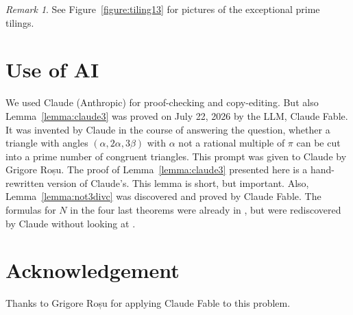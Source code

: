 \documentclass{amsart}
\theoremstyle{plain}
\theoremstyle{definition}
\theoremstyle{remark}
\newtheorem*{remark}{Remark}
\begin{document}
\begin{remark} 
See Figure~\ref{figure:tiling13} for pictures of the exceptional prime tilings.
\end{remark}

\enlargethispage{3\baselineskip}





\section*{Use of AI}
We used Claude (Anthropic) for proof-checking and copy-editing. 
But also Lemma~\ref{lemma:claude3} was proved on
July 22, 2026 by the LLM, Claude Fable.  It was invented by Claude
in the course of answering the question, whether a triangle 
with angles $(\alpha,2\alpha,3\beta)$ with $\alpha$ not a rational
multiple of $\pi$ can be cut into a prime number of congruent triangles.
This prompt was given to Claude 
by Grigore Roșu.    The proof of Lemma~\ref{lemma:claude3}  presented here
is a hand-rewritten version of Claude's.  
This lemma is short, but important.
Also, Lemma~\ref{lemma:not3divc} was discovered and proved by Claude Fable.
The formulas for $N$ in the four last theorems were already in \cite{zhang2026},
but were rediscovered by Claude without looking at  \cite{zhang2026}.  

 \section*{Acknowledgement}
 Thanks to  Grigore Roșu for applying Claude Fable to this problem. 
\end{document}
